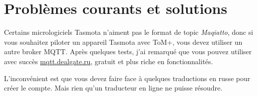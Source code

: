 \section{Problèmes courants et solutions}

Certains micrologiciels Tasmota n'aiment pas le format de topic \textit{Maqiatto}, donc si vous souhaitez 
piloter un appareil Tasmota avec ToM+, vous devez utiliser un autre broker MQTT.
Après quelques tests, j'ai remarqué que vous pouvez utiliser avec succès \href{https://dealgate.ru/}{mqtt.dealgate.ru},
gratuit et plus riche en fonctionnalités. 

L'inconvénient est que vous devez faire face à quelques traductions en russe pour créer le compte.
Mais rien qu'un traducteur en ligne ne puisse résoudre.
